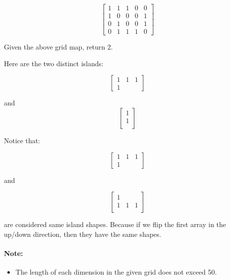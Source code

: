 \begin{flushleft}

\[
\begin{bmatrix}
1 & 1 & 1 & 0 & 0\\
1 & 0 & 0 & 0 & 1\\
0 & 1 & 0 & 0 & 1\\
0 & 1 & 1 & 1 & 0
\end{bmatrix}
\]

Given the above grid map, return 2.

Here are the two distinct islands:

\[
\begin{bmatrix}
1 & 1 & 1\\
1 &  & 
\end{bmatrix}
\]

and
\[
\begin{bmatrix}
1\\
1\\
\end{bmatrix}
\]


Notice that:

\[
\begin{bmatrix}
1 & 1 & 1\\
1 &  & 
\end{bmatrix}
\]

and

\[
\begin{bmatrix}
1 &  & \\
1 & 1 & 1\\
\end{bmatrix}
\]


are considered same island shapes. Because if we flip the first array in the up/down direction, then they have the same shapes.

\end{flushleft}

\paragraph{Note:} 
\begin{itemize}
\item The length of each dimension in the given grid does not exceed 50. 
\end{itemize}
